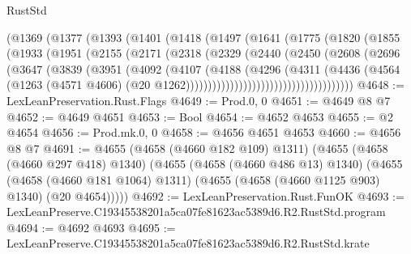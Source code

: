 \begin{lexlean}{RustStd}
\begin{coremodule}
                (@1369
                  (@1377
                    (@1393
                      (@1401
                        (@1418
                          (@1497
                            (@1641
                              (@1775
                                (@1820
                                  (@1855
                                    (@1933
                                      (@1951
                                        (@2155
                                          (@2171
                                            (@2318
                                              (@2329
                                                (@2440
                                                  (@2450
                                                    (@2608
                                                      (@2696
                                                        (@3647
                                                          (@3839
                                                            (@3951
                                                              (@4092
                                                                (@4107
                                                                  (@4188
                                                                    (@4296
                                                                      (@4311
                                                                        (@4436
                                                                          (@4564
                                                                            (@1263
                                                                              (@4571 @4606)
                                                                              (@20
                                                                                @1262))))))))))))))))))))))))))))))))))))))
@4648 := LexLeanPreservation.Rust.Flags
@4649 := Prod.{0, 0}
@4651 := @4649 @8 @7
@4652 := @4649 @4651
@4653 := Bool
@4654 := @4652 @4653
@4655 := @2 @4654
@4656 := Prod.mk.{0, 0}
@4658 := @4656 @4651 @4653
@4660 := @4656 @8 @7
@4691 := @4655
    (@4658 (@4660 @182 @109) @1311)
    (@4655
      (@4658 (@4660 @297 @418) @1340)
      (@4655
        (@4658 (@4660 @486 @13) @1340)
        (@4655
          (@4658 (@4660 @181 @1064) @1311)
          (@4655 (@4658 (@4660 @1125 @903) @1340) (@20 @4654)))))
@4692 := LexLeanPreservation.Rust.FunOK
@4693 := LexLeanPreserve.C19345538201a5ca07fe81623ac5389d6.R2.RustStd.program
@4694 := @4692 @4693
@4695 := LexLeanPreserve.C19345538201a5ca07fe81623ac5389d6.R2.RustStd.krate

\end{coremodule}
\end{lexlean}
